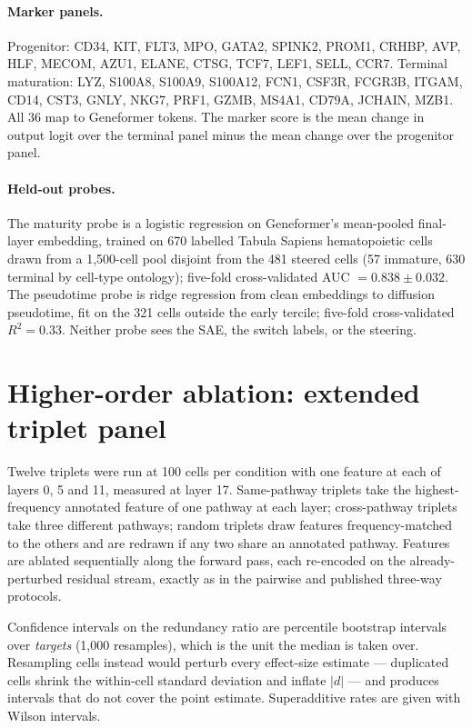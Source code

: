 \documentclass[10pt,letterpaper]{article}
\begin{document}
\paragraph{Marker panels.} Progenitor: CD34, KIT, FLT3, MPO, GATA2, SPINK2, PROM1, CRHBP, AVP, HLF, MECOM, AZU1, ELANE, CTSG, TCF7, LEF1, SELL, CCR7. Terminal maturation: LYZ, S100A8, S100A9, S100A12, FCN1, CSF3R, FCGR3B, ITGAM, CD14, CST3, GNLY, NKG7, PRF1, GZMB, MS4A1, CD79A, JCHAIN, MZB1. All 36 map to Geneformer tokens. The marker score is the mean change in output logit over the terminal panel minus the mean change over the progenitor panel.

\paragraph{Held-out probes.} The maturity probe is a logistic regression on Geneformer's mean-pooled final-layer embedding, trained on 670 labelled Tabula Sapiens hematopoietic cells drawn from a 1{,}500-cell pool disjoint from the 481 steered cells (57 immature, 630 terminal by cell-type ontology); five-fold cross-validated AUC $=0.838\pm0.032$. The pseudotime probe is ridge regression from clean embeddings to diffusion pseudotime, fit on the 321 cells outside the early tercile; five-fold cross-validated $R^2=0.33$. Neither probe sees the SAE, the switch labels, or the steering.


\section{Higher-order ablation: extended triplet panel}
\label{supp:triplets_full}

Twelve triplets were run at 100 cells per condition with one feature at each of layers 0, 5 and 11, measured at layer 17. Same-pathway triplets take the highest-frequency annotated feature of one pathway at each layer; cross-pathway triplets take three different pathways; random triplets draw features frequency-matched to the others and are redrawn if any two share an annotated pathway. Features are ablated sequentially along the forward pass, each re-encoded on the already-perturbed residual stream, exactly as in the pairwise and published three-way protocols.

Confidence intervals on the redundancy ratio are percentile bootstrap intervals over \emph{targets} (1{,}000 resamples), which is the unit the median is taken over. Resampling cells instead would perturb every effect-size estimate --- duplicated cells shrink the within-cell standard deviation and inflate $|d|$ --- and produces intervals that do not cover the point estimate. Superadditive rates are given with Wilson intervals.
\end{document}
